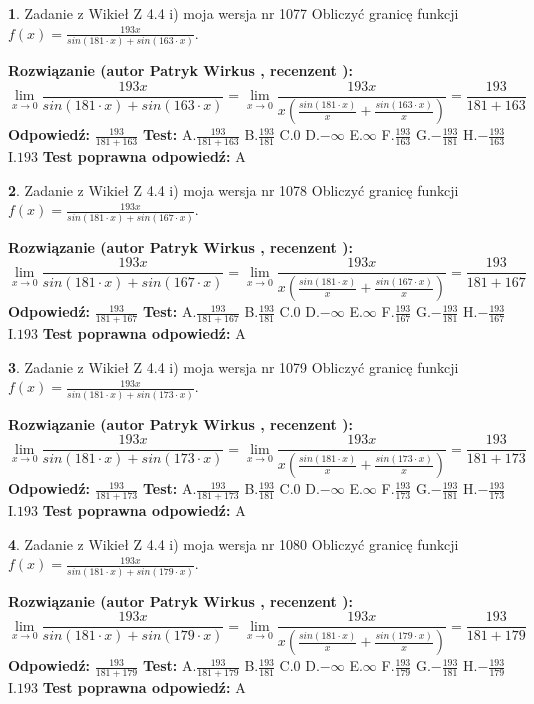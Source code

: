 \documentclass[12pt, a4paper]{article}
\theoremstyle{definition} %
\newtheorem{zad}{}
\newcommand{\zadStart}[1]{\begin{zad}#1\newline}
\newcommand{\zadStop}{\end{zad}}
\newcommand{\rozwStart}[2]{\noindent \textbf{Rozwiązanie (autor #1 , recenzent #2): }\newline}
\newcommand{\rozwStop}{\newline}
\newcommand{\odpStart}{\noindent \textbf{Odpowiedź:}\newline}
\newcommand{\odpStop}{\newline}
\newcommand{\testStart}{\noindent \textbf{Test:}\newline}
\newcommand{\testStop}{\newline}
\newcommand{\kluczStart}{\noindent \textbf{Test poprawna odpowiedź:}\newline}
\newcommand{\kluczStop}{\newline}
\begin{document}
\zadStart{Zadanie z Wikieł Z 4.4 i) moja wersja nr 1077}
Obliczyć granicę funkcji $f(x)=\frac{193x}{sin(181\cdot x) +sin(163\cdot x)}$.
\zadStop
\rozwStart{Patryk Wirkus}{}
$$\lim\limits_{x\to 0}\frac{193x}{sin(181\cdot x) +sin(163\cdot x)}=\lim\limits_{x\to 0}\frac{193x}{x(\frac{sin(181\cdot x)}{x}+\frac{sin(163\cdot x)}{x})}=\frac{193}{181+163}$$
\rozwStop
\odpStart
$\frac{193}{181+163}$
\odpStop
\testStart
A.$\frac{193}{181+163}$
B.$\frac{193}{181}$
C.$0$
D.$-\infty$
E.$\infty$
F.$\frac{193}{163}$
G.$-\frac{193}{181}$
H.$-\frac{193}{163}$
I.$193$
\testStop
\kluczStart
A
\kluczStop



\zadStart{Zadanie z Wikieł Z 4.4 i) moja wersja nr 1078}
Obliczyć granicę funkcji $f(x)=\frac{193x}{sin(181\cdot x) +sin(167\cdot x)}$.
\zadStop
\rozwStart{Patryk Wirkus}{}
$$\lim\limits_{x\to 0}\frac{193x}{sin(181\cdot x) +sin(167\cdot x)}=\lim\limits_{x\to 0}\frac{193x}{x(\frac{sin(181\cdot x)}{x}+\frac{sin(167\cdot x)}{x})}=\frac{193}{181+167}$$
\rozwStop
\odpStart
$\frac{193}{181+167}$
\odpStop
\testStart
A.$\frac{193}{181+167}$
B.$\frac{193}{181}$
C.$0$
D.$-\infty$
E.$\infty$
F.$\frac{193}{167}$
G.$-\frac{193}{181}$
H.$-\frac{193}{167}$
I.$193$
\testStop
\kluczStart
A
\kluczStop



\zadStart{Zadanie z Wikieł Z 4.4 i) moja wersja nr 1079}
Obliczyć granicę funkcji $f(x)=\frac{193x}{sin(181\cdot x) +sin(173\cdot x)}$.
\zadStop
\rozwStart{Patryk Wirkus}{}
$$\lim\limits_{x\to 0}\frac{193x}{sin(181\cdot x) +sin(173\cdot x)}=\lim\limits_{x\to 0}\frac{193x}{x(\frac{sin(181\cdot x)}{x}+\frac{sin(173\cdot x)}{x})}=\frac{193}{181+173}$$
\rozwStop
\odpStart
$\frac{193}{181+173}$
\odpStop
\testStart
A.$\frac{193}{181+173}$
B.$\frac{193}{181}$
C.$0$
D.$-\infty$
E.$\infty$
F.$\frac{193}{173}$
G.$-\frac{193}{181}$
H.$-\frac{193}{173}$
I.$193$
\testStop
\kluczStart
A
\kluczStop



\zadStart{Zadanie z Wikieł Z 4.4 i) moja wersja nr 1080}
Obliczyć granicę funkcji $f(x)=\frac{193x}{sin(181\cdot x) +sin(179\cdot x)}$.
\zadStop
\rozwStart{Patryk Wirkus}{}
$$\lim\limits_{x\to 0}\frac{193x}{sin(181\cdot x) +sin(179\cdot x)}=\lim\limits_{x\to 0}\frac{193x}{x(\frac{sin(181\cdot x)}{x}+\frac{sin(179\cdot x)}{x})}=\frac{193}{181+179}$$
\rozwStop
\odpStart
$\frac{193}{181+179}$
\odpStop
\testStart
A.$\frac{193}{181+179}$
B.$\frac{193}{181}$
C.$0$
D.$-\infty$
E.$\infty$
F.$\frac{193}{179}$
G.$-\frac{193}{181}$
H.$-\frac{193}{179}$
I.$193$
\testStop
\kluczStart
A
\kluczStop
\end{document}
